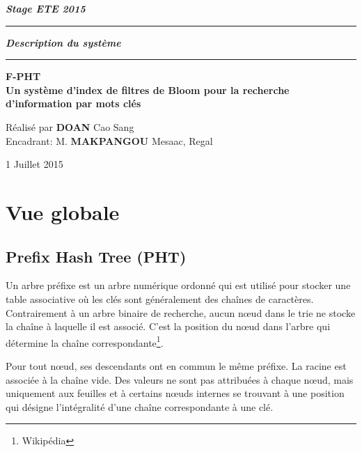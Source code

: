 \documentclass[a4paper,11pt]{report}
\begin{document}
	\begin{titlepage}
		\begin{center}
			\large\bfseries\itshape Stage ETE 2015\\
		\end{center}
		\noindent\rule{\linewidth}{3pt}

		\begin{center}
			\Huge\bfseries\itshape Description du système\\
		\end{center}
		
		\noindent\rule{\linewidth}{3pt}
		\begin{center}
			\bfseries
			\large F-PHT \\
			\large Un système d'index de filtres de Bloom pour la recherche d'information par mots clés
		\end{center}
		\begin{center}
			Réalisé par \textbf{DOAN} Cao Sang \\
			Encadrant: M. \textbf{MAKPANGOU} Mesaac, Regal
		\end{center}
		\begin{center}
			1 Juillet 2015
		\end{center}
	\end{titlepage}

\tableofcontents
\newtheorem{algorithme}{Algorithme}


\chapter{Vue globale}
\section{Prefix Hash Tree (PHT)}
	Un arbre préfixe est un arbre numérique ordonné qui est utilisé pour stocker une table associative où les clés sont généralement des chaînes de caractères. Contrairement à un arbre binaire de recherche, aucun nœud dans le trie ne stocke la chaîne à laquelle il est associé. C'est la position du nœud dans l'arbre qui détermine la chaîne correspondante\footnote{Wikipédia}.
	
	Pour tout nœud, ses descendants ont en commun le même préfixe. La racine est associée à la chaîne vide. Des valeurs ne sont pas attribuées à chaque nœud, mais uniquement aux feuilles et à certains nœuds internes se trouvant à une position qui désigne l'intégralité d'une chaîne correspondante à une clé.
	
\end{document}
